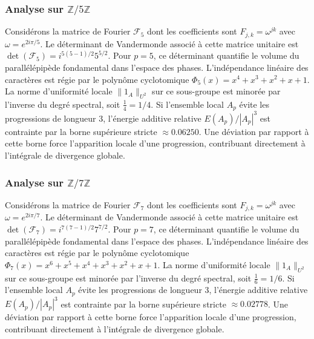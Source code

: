 \documentclass[11pt,a4paper]{article}
\begin{document}
\subsubsection{Analyse sur $\mathbb{Z}/5\mathbb{Z}$}
Considérons la matrice de Fourier $\mathcal{F}_{5}$ dont les coefficients sont $F_{j, k} = \omega^{j k}$ avec $\omega = e^{2i\pi/5}$. Le déterminant de Vandermonde associé à cette matrice unitaire est $\det(\mathcal{F}_{5}) = i^{5(5-1)/2} 5^{5/2}$. Pour $p = 5$, ce déterminant quantifie le volume du parallélépipède fondamental dans l'espace des phases. L'indépendance linéaire des caractères est régie par le polynôme cyclotomique $\Phi_{5}(x) = x^{4} + x^{3} + x^{2} + x + 1$. La norme d'uniformité locale $\|1_A\|_{U^2}$ sur ce sous-groupe est minorée par l'inverse du degré spectral, soit $\frac{1}{4} = 1/4$. Si l'ensemble local $A_p$ évite les progressions de longueur 3, l'énergie additive relative $E(A_p) / |A_p|^3$ est contrainte par la borne supérieure stricte $\approx 0.06250$. Une déviation par rapport à cette borne force l'apparition locale d'une progression, contribuant directement à l'intégrale de divergence globale.
\subsubsection{Analyse sur $\mathbb{Z}/7\mathbb{Z}$}
Considérons la matrice de Fourier $\mathcal{F}_{7}$ dont les coefficients sont $F_{j, k} = \omega^{j k}$ avec $\omega = e^{2i\pi/7}$. Le déterminant de Vandermonde associé à cette matrice unitaire est $\det(\mathcal{F}_{7}) = i^{7(7-1)/2} 7^{7/2}$. Pour $p = 7$, ce déterminant quantifie le volume du parallélépipède fondamental dans l'espace des phases. L'indépendance linéaire des caractères est régie par le polynôme cyclotomique $\Phi_{7}(x) = x^{6} + x^{5} + x^{4} + x^{3} + x^{2} + x + 1$. La norme d'uniformité locale $\|1_A\|_{U^2}$ sur ce sous-groupe est minorée par l'inverse du degré spectral, soit $\frac{1}{6} = 1/6$. Si l'ensemble local $A_p$ évite les progressions de longueur 3, l'énergie additive relative $E(A_p) / |A_p|^3$ est contrainte par la borne supérieure stricte $\approx 0.02778$. Une déviation par rapport à cette borne force l'apparition locale d'une progression, contribuant directement à l'intégrale de divergence globale.
\end{document}
